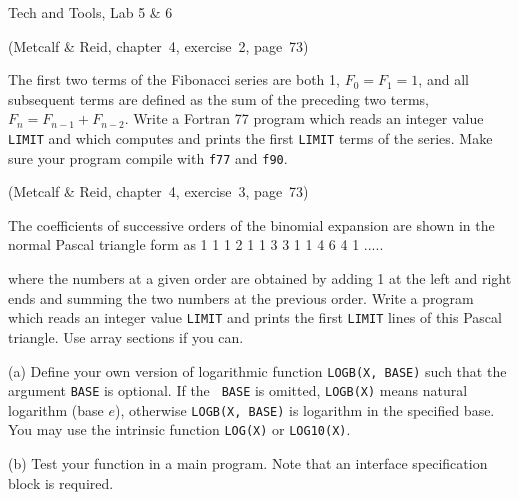 
\nopagenumbers
\centerline{\titlefont Tech and Tools, Lab 5 \& 6}
\bigskip
{}
\bigskip
{}
\medskip
 (Metcalf \& Reid, chapter~4,
exercise~2, page~73)
\item{} The first two terms of the Fibonacci series are both 1,
$F_0 = F_1 = 1$, and all subsequent terms are defined as the
sum of the preceding two terms, $F_n = F_{n-1} + F_{n-2}$. 
Write a Fortran 77 program which reads an integer value {\tt LIMIT}
and which computes and prints the first {\tt LIMIT} 
terms of the series.  Make sure your program compile with
{\tt f77} and {\tt f90}.

 (Metcalf \& Reid, chapter~4,
exercise~3, page~73)
\item{} The coefficients of successive orders of the binomial expansion
are shown in the normal Pascal triangle form as
   1 1
  1 2 1
 1 3 3 1
1 4 6 4 1
  .....
\tted
\item{} where the numbers at a given order are obtained by adding 1 at
the left and right ends and summing the two numbers at the previous order.
Write a program which reads an integer value {\tt LIMIT} and prints the
first {\tt LIMIT} lines of this Pascal triangle.  Use array sections
if you can.

\medskip
\item{} (a) Define your own version of logarithmic function {\tt LOGB(X,
BASE)} such that the argument {\tt BASE} is optional.  If the {\tt
BASE} is omitted, {\tt LOGB(X)} means natural logarithm (base $e$), 
otherwise {\tt LOGB(X, BASE)} is logarithm in the specified base. 
You may use the intrinsic function {\tt LOG(X)} or {\tt LOG10(X)}.
\item{} (b) Test your function in a main program.  Note that an
interface specification block is required.

